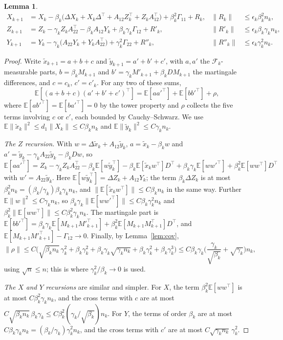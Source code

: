 \documentclass[11pt]{article}
\newtheorem{lemma}[theorem]{Lemma}
\theoremstyle{definition}
\theoremstyle{remark}
\newcommand{\E}{\mathbb{E}}
\newcommand{\F}{\mathcal{F}}
\begin{document}
\begin{lemma}\label{lem:rec}
\begin{align*}
  X_{k+1} &= X_k - \beta_k\big(\Delta X_k + X_k\Delta^\top + A_{12}Z_k^\top + Z_kA_{12}^\top\big)
    + \beta_k^2\Gamma_{11} + R_k, & \|R_k\| &\le \epsilon_k\beta_k^2n_k,\\
  Z_{k+1} &= Z_k - \gamma_kZ_kA_{22}^\top - \beta_kA_{12}Y_k + \beta_k\gamma_k\Gamma_{12} + R'_k,
    & \|R'_k\| &\le \epsilon_k\beta_k\gamma_kn_k,\\
  Y_{k+1} &= Y_k - \gamma_k\big(A_{22}Y_k + Y_kA_{22}^\top\big) + \gamma_k^2\Gamma_{22} + R''_k,
    & \|R''_k\| &\le \epsilon_k\gamma_k^2n_k .
\end{align*}
\end{lemma}
\begin{proof}
Write $\tilde x_{k+1} = a + b + c$ and $\tilde y_{k+1} = a' + b' + c'$, with $a, a'$ the
$\F_k$-measurable parts, $b = \beta_kM_{k+1}$ and $b' = \gamma_kM'_{k+1} + \beta_kDM_{k+1}$
the martingale differences, and $c = c_k$, $c' = c'_k$. For any two of these sums,
\[
  \E[(a + b + c)(a' + b' + c')^\top] = \E[aa'^\top] + \E[bb'^\top] + \rho,
\]
where $\E[ab'^\top] = \E[ba'^\top] = 0$ by the tower property and $\rho$ collects the five terms
involving $c$ or $c'$, each bounded by Cauchy--Schwarz. We use
$\E\|\tilde x_k\|^2 \le d_1\|X_k\| \le C\beta_kn_k$ and $\E\|\tilde y_k\|^2 \le C\gamma_kn_k$.

\emph{The $Z$ recursion.} With $w = \Delta\tilde x_k + A_{12}\tilde y_k$,
$a = \tilde x_k - \beta_kw$ and $a' = \tilde y_k - \gamma_kA_{22}\tilde y_k - \beta_kDw$, so
\[
  \E[aa'^\top] = Z_k - \gamma_kZ_kA_{22}^\top - \beta_k\E[w\tilde y_k^\top] - \beta_k\E[\tilde x_kw^\top]D^\top
    + \beta_k\gamma_k\E[ww'^\top] + \beta_k^2\E[ww^\top]D^\top
\]
with $w' = A_{22}\tilde y_k$. Here $\E[w\tilde y_k^\top] = \Delta Z_k + A_{12}Y_k$; the term
$\beta_k\Delta Z_k$ is at most $\beta_k^2n_k = (\beta_k/\gamma_k)\beta_k\gamma_kn_k$, and
$\|\E[\tilde x_kw^\top]\| \le C\beta_kn_k$ in the same way. Further
$\E\|w\|^2 \le C\gamma_kn_k$, so $\beta_k\gamma_k\|\E[ww'^\top]\| \le C\beta_k\gamma_k^2n_k$ and
$\beta_k^2\|\E[ww^\top]\| \le C\beta_k^2\gamma_kn_k$. The martingale part is
$\E[bb'^\top] = \beta_k\gamma_k\E[M_{k+1}M'^\top_{k+1}] + \beta_k^2\E[M_{k+1}M_{k+1}^\top]D^\top$, and
$\E[M_{k+1}M'^\top_{k+1}] - \Gamma_{12} \to 0$. Finally, by Lemma~\ref{lem:cov},
\[
  \|\rho\| \le C\Big(\sqrt{\beta_kn_k}\,\gamma_k^2 + \beta_k\gamma_k^2 + \beta_k\gamma_k\sqrt{\gamma_kn_k}
    + \beta_k\gamma_k^2 + \beta_k\gamma_k^3\Big)
  \le C\beta_k\gamma_k\Big(\frac{\gamma_k}{\sqrt{\beta_k}} + \sqrt{\gamma_k}\Big)n_k,
\]
using $\sqrt{n} \le n$; this is where $\gamma_k^2/\beta_k \to 0$ is used.

\emph{The $X$ and $Y$ recursions} are similar and simpler. For $X$, the term
$\beta_k^2\E[ww^\top]$ is at most $C\beta_k^2\gamma_kn_k$, and the cross terms with $c$ are at most
$C\sqrt{\beta_kn_k}\,\beta_k\gamma_k \le C\beta_k^2(\gamma_k/\sqrt{\beta_k})n_k$. For $Y$, the terms
of order $\beta_k$ are at most $C\beta_k\gamma_kn_k = (\beta_k/\gamma_k)\gamma_k^2n_k$, and the cross
terms with $c'$ are at most $C\sqrt{\gamma_kn_k}\,\gamma_k^2$.
\end{proof}
\end{document}
